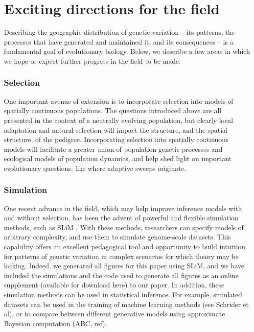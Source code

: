 \documentclass{ar-1col}
\newcommand{\g}[1]{{\color{blue}{#1}}}
\newcommand{\todo}[1]{{\textbf{\color{red}{#1}}}}
\begin{document}
\g{feel like i'm not making the point clearly}

\todo{read through, edit, rewrite?}

\section{Exciting directions for the field}

Describing the geographic distribution of genetic variation -- 
its patterns, 
the processes that have generated and maintained it, 
and its consequences -- 
is a fundamental goal of evolutionary biology.
Below, we describe a few areas 
in which we hope or expect further progress in the field to be made.

\subsubsection{Selection}
One important avenue of extension is to incorporate selection into 
models of spatially continuous populations. 
The questions introduced above are all presented in the context 
of a neutrally evolving population,
but clearly local adaptation and natural selection will impact 
the structure, and the spatial structure, of the pedigree.
Incorporating selection into spatially continuous models 
will facilitate a greater union of population genetic processes 
and ecological models of population dynamics, 
and help shed light on important evolutionary questions, 
like where adaptive sweeps originate. 
\g{more about why this is hard?}

\subsubsection{Simulation} 
One recent advance in the field, 
which may help improve inference models with and without selection, 
has been the advent of powerful and flexible simulation methods, 
such as SLiM \cite{SLiM}.
With these methods, 
researchers can specify models of arbitrary complexity, 
and use them to simulate genome-scale datasets.
This capability offers an excellent pedagogical tool 
and opportunity to build intuition for patterns of genetic variation 
in complex scenarios for which theory may be lacking.
Indeed, we generated all figures for this paper using SLiM, 
and we have included the simulations 
and the code used to generate all figures 
as an online supplement (available for download here) 
to our paper.
In addition, these simulation methods can be used in statistical inference.
For example, simulated datasets can be used in the training 
of machine learning methods (see Schrider et al), 
or to compare between different generative models using 
approximate Bayesian computation (ABC, ref).
\end{document}
